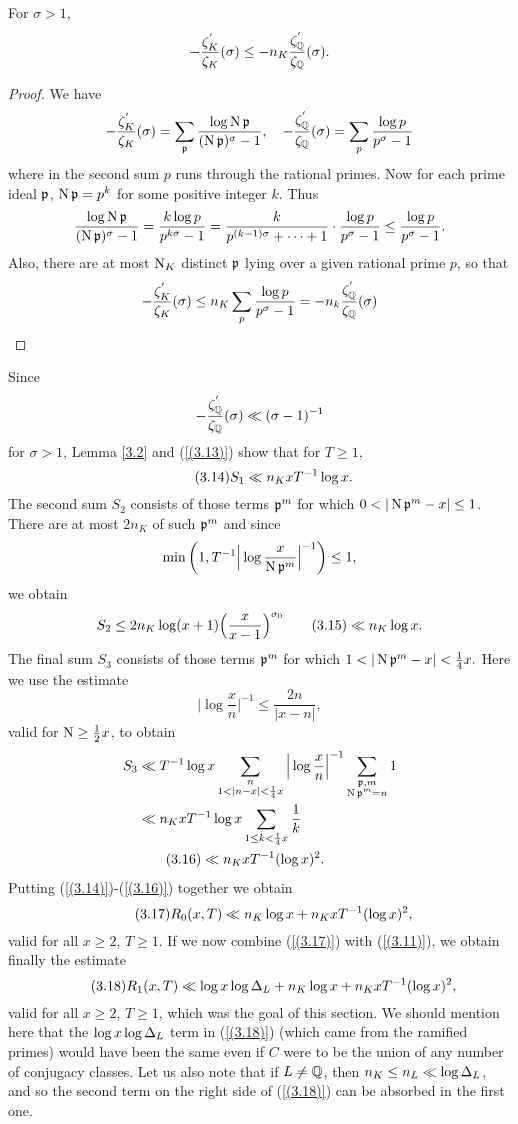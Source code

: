 \documentclass[./main]{subfiles}
\begin{document}
\begin{lemma}\label{3.2}
For $\sigma>1$,
\[-\frac{\zeta_K^{'}}{\zeta_K}(\sigma)\le -n_K \frac{\zeta_{\mathbb{Q}} ^{'}}{\zeta_{\mathbb{Q}} }(\sigma). \]
\end{lemma}
\begin{proof}
We have
\[ -\frac{\zeta_K^{'}}{\zeta_K}(\sigma)=\sum_{\mathfrak{p}}\frac{\log \operatorname{N}\mathfrak{p}}{(\operatorname{N}\mathfrak{p})^\sigma-1}, \quad -\frac{\zeta_{\mathbb{Q}} ^{'}}{\zeta_{\mathbb{Q}} }(\sigma)=\sum_p \frac{\log p}{p^\sigma-1}\]
where in the second sum $p$ runs through the rational primes. Now for each prime ideal $\mathfrak{p}$, $\operatorname{N}\mathfrak{p}=p^k$ for some positive integer $k$. Thus
\[ \frac{\log \operatorname{N}\mathfrak{p}}{(\operatorname{N}\mathfrak{p})^\sigma-1}=\frac{k \log p}{p^{k\sigma}-1}=\frac{k}{p^{(k-1)\sigma}+ \dots +1 }\cdot \frac{\log p}{p^\sigma-1}\le \frac{\log p}{p^{\sigma}-1}. \]
Also, there are at most $\operatorname{N}_K$ distinct $\mathfrak{p}$ lying over a given rational prime $p$, so that
\[ -\frac{\zeta_K^{'}}{\zeta_K}(\sigma)\le n_K \sum_p \frac{\log p}{p^\sigma-1}=-n_k\frac{\zeta_{\mathbb{Q}} ^{'}}{\zeta_{\mathbb{Q}} }(\sigma)\]
\end{proof}
Since 
\[-\frac{\zeta_{\mathbb{Q}} ^{'}}{\zeta_{\mathbb{Q}} }(\sigma)\ll(\sigma-1)^{-1} \]
for $\sigma>1$, Lemma \ref{3.2}
and (\ref{(3.13)}) show that for $T\ge 1$, 
\[\tag{3.14}\label{(3.14)} S_1 \ll n_KxT^{-1}\log x.\]
The second sum $S_2$ consists of those terms $\mathfrak{p}^m$ for which $0<|\norm\p^m-x| \le 1$. There are at most $2n_K$ of such $\mathfrak{p}^m$ and since
\[ \min\bigg(1, T^{-1}\Big| \log \frac{x}{\operatorname{N}\mathfrak{p}^m}\Big|^{-1}\bigg) \le 1,\]
we obtain
\[
    S_2  \le 2n_K\log(x+1) \Big(\frac{x}{x-1}\Big)^{\sigma_0} 
     \label{3.15}\tag{3.15}\ll  n_K\log x.
\]
The final sum $S_3$ consists of those terms $\mathfrak{p}^m$ for which $1 < |\operatorname{N}\mathfrak{p}^m-x|<\frac{1}{4}x.$ Here we use the estimate
\[ \Big|\log \frac{x}{n}\Big|^{-1}\le \frac{2n}{|x-n|}, \]
valid for $\operatorname{N}\ge \frac{1}{2}x$, to obtain
\begin{align*}
    S_3&\ll T^{-1}\log x \sum_{\substack{n \\ 1< |n-x|< \frac{1}{4}x}}\Big|\log \frac{x}{n}\Big|^{-1}\sum_{\substack{\mathfrak{p}, m \\ \operatorname{N}\mathfrak{p}^m=n}}1 \\
    & \ll n_KxT^{-1}\log x \sum_{1 \le k < \frac{1}{4}x} \frac{1}{k} \\
    & \label{(3.16)} \tag{3.16}\ll n_K xT^{-1}(\log x)^2.
\end{align*}
Putting (\ref{(3.14)})-(\ref{(3.16)}) together we obtain
\[\label{(3.17)} \tag{3.17} R_0(x,T) \ll n_K\log x + n_KxT^{-1}(\log x)^2,\]
valid for all $x \ge 2$, $T\ge 1$. If we now combine (\ref{(3.17)}) with (\ref{(3.11)}), we obtain finally the estimate
\[\label{(3.18)} \tag{3.18} R_1(x,T) \ll\log x \log \Delta_L+n_K\log x+ n_KxT^{-1}(\log x)^2,  \]
valid for all $x \ge 2$, $T\ge 1$, which was the goal of this section. We should mention here that the $\log x \log \Delta_L$ term in (\ref{(3.18)}) (which came from the ramified primes) would have been the same even if $C$ were to be the union of any number of conjugacy classes. Let us also note that if $L \neq \mathbb{Q} $, then $n_K \le n_L \ll \log \Delta_L$, and so the second term on the right side of (\ref{(3.18)}) can be absorbed in the first one.
\end{document}
